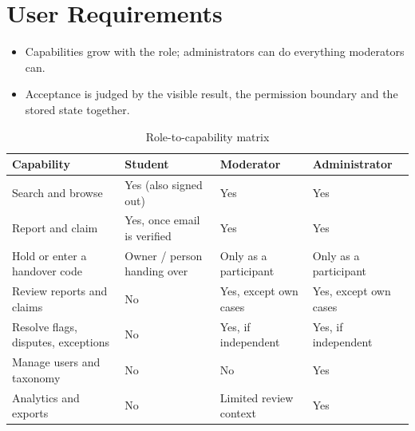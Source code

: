 \documentclass[12pt,a4paper,oneside]{report}
\begin{document}
\section{User Requirements}
\begin{itemize}
  \item Capabilities grow with the role; administrators can do everything moderators can.
  \item Acceptance is judged by the visible result, the permission boundary and the stored state together.
\end{itemize}
\begin{table}[H]
\centering\small
\caption{Role-to-capability matrix}
\begin{tabularx}{\textwidth}{P{34mm}XXX}
\toprule
Capability & Student & Moderator & Administrator\\
\midrule
Search and browse & Yes (also signed out) & Yes & Yes\\
Report and claim & Yes, once email is verified & Yes & Yes\\
Hold or enter a handover code & Owner / person handing over & Only as a participant & Only as a participant\\
Review reports and claims & No & Yes, except own cases & Yes, except own cases\\
Resolve flags, disputes, exceptions & No & Yes, if independent & Yes, if independent\\
Manage users and taxonomy & No & No & Yes\\
Analytics and exports & No & Limited review context & Yes\\
\bottomrule
\end{tabularx}
\end{table}
\end{document}
